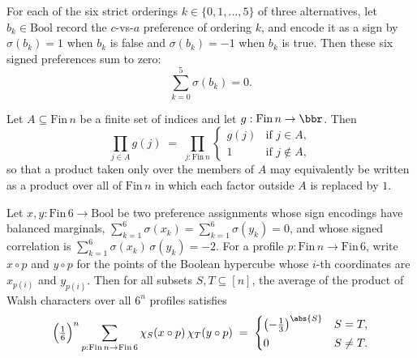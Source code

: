 \begin{lemma}
\label{ArrowTheorem.sum_caPref_sign}
\leanok
{}
For each of the six strict orderings $k\in\{0,1,\dots,5\}$ of three alternatives, let
$b_k\in\mathrm{Bool}$ record the $c$-vs-$a$ preference of ordering $k$, and encode it as
a sign by $\sigma(b_k)=1$ when $b_k$ is false and $\sigma(b_k)=-1$ when $b_k$ is true.
Then these six signed preferences sum to zero:
\[
  \sum_{k=0}^{5} \sigma(b_k) = 0.
\]
\end{lemma}

\begin{lemma}
\label{ArrowTheorem.prod_finset_eq_prod_univ_ite}
\leanok
{}
Let $A \subseteq \mathrm{Fin}\,n$ be a finite set of indices and let $g :
\mathrm{Fin}\,n \to \bbr$. Then
\[
  \prod_{j \in A} g(j) \;=\; \prod_{j : \mathrm{Fin}\,n}
    \begin{cases} g(j) & \text{if } j \in A, \\ 1 & \text{if } j \notin A, \end{cases}
\]
so that a product taken only over the members of $A$ may equivalently be written as a
product over all of $\mathrm{Fin}\,n$ in which each factor outside $A$ is replaced by
$1$.
\end{lemma}

\begin{lemma}
\label{ArrowTheorem.profile_kernel_gen}
\leanok
{}
Let $x, y : \mathrm{Fin}\,6 \to \mathrm{Bool}$ be two preference assignments whose sign
encodings have balanced marginals, $\sum_{k=1}^{6}\sigma(x_k) =
\sum_{k=1}^{6}\sigma(y_k) = 0$, and whose signed correlation is
$\sum_{k=1}^{6}\sigma(x_k)\,\sigma(y_k) = -2$. For a profile $p : \mathrm{Fin}\,n \to
\mathrm{Fin}\,6$, write $x\circ p$ and $y\circ p$ for the points of the Boolean
hypercube whose $i$-th coordinates are $x_{p(i)}$ and $y_{p(i)}$. Then for all subsets
$S, T \subseteq [n]$, the average of the product of Walsh characters over all $6^n$
profiles satisfies
\[
  \Bigl(\tfrac16\Bigr)^{n}\sum_{p:\mathrm{Fin}\,n \to \mathrm{Fin}\,6}
    \chi_S(x\circ p)\,\chi_T(y\circ p)
  \;=\;
  \begin{cases} \bigl(-\tfrac13\bigr)^{\abs{S}} & S = T,\\[2pt] 0 & S \ne T. \end{cases}
\]
\end{lemma}

